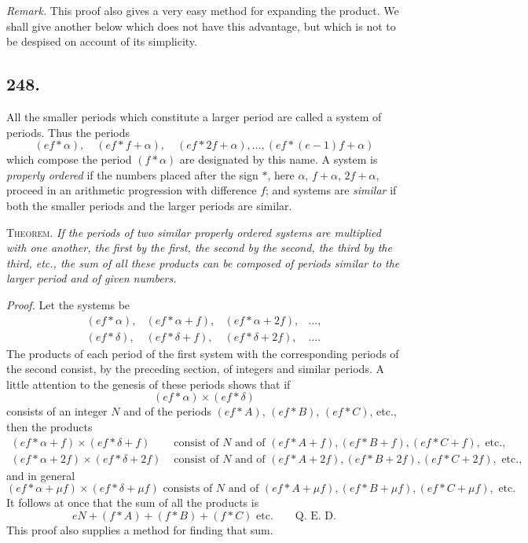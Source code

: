 \documentclass[12pt]{article}
\begin{document}
\textit{Remark.} This proof also gives a very easy method for expanding the product. We shall give another below which does not have this advantage, but which is not to be despised on account of its simplicity.

\subsection*{248.}
All the smaller periods which constitute a larger period are called a system of periods. Thus the periods
\[
(ef*\alpha),\quad (ef*f+\alpha),\quad (ef*2f+\alpha),\ldots,(ef*(e-1)f+\alpha)
\]
which compose the period $(f*\alpha)$ are designated by this name. A system is \textit{properly ordered} if the numbers placed after the sign $*$, here $\alpha$, $f+\alpha$, $2f+\alpha$, proceed in an arithmetic progression with difference $f$; and systems are \textit{similar} if both the smaller periods and the larger periods are similar.

\textsc{Theorem.} \textit{If the periods of two similar properly ordered systems are multiplied with one another, the first by the first, the second by the second, the third by the third, etc., the sum of all these products can be composed of periods similar to the larger period and of given numbers.}

\textit{Proof.} Let the systems be
\[
\begin{array}{cccc}
(ef*\alpha),&(ef*\alpha+f),&(ef*\alpha+2f),&\ldots,\\
(ef*\delta),&(ef*\delta+f),&(ef*\delta+2f),&\ldots.
\end{array}
\]
The products of each period of the first system with the corresponding periods of the second consist, by the preceding section, of integers and similar periods. A little attention to the genesis of these periods shows that if
\[
(ef*\alpha)\times(ef*\delta)
\]
consists of an integer $N$ and of the periods $(ef*A)$, $(ef*B)$, $(ef*C)$, etc., then the products
\[
\begin{aligned}
(ef*\alpha+f)\times(ef*\delta+f)&\text{ consist of }N\text{ and of }(ef*A+f),(ef*B+f),(ef*C+f),\text{ etc.},\\
(ef*\alpha+2f)\times(ef*\delta+2f)&\text{ consist of }N\text{ and of }(ef*A+2f),(ef*B+2f),(ef*C+2f),\text{ etc.},
\end{aligned}
\]
and in general
\[
(ef*\alpha+\mu f)\times(ef*\delta+\mu f)\text{ consists of }N\text{ and of }(ef*A+\mu f),(ef*B+\mu f),(ef*C+\mu f),\text{ etc.}
\]
It follows at once that the sum of all the products is
\[
eN+(f*A)+(f*B)+(f*C)\text{ etc.}\qquad\text{Q. E. D.}
\]
This proof also supplies a method for finding that sum.
\end{document}
